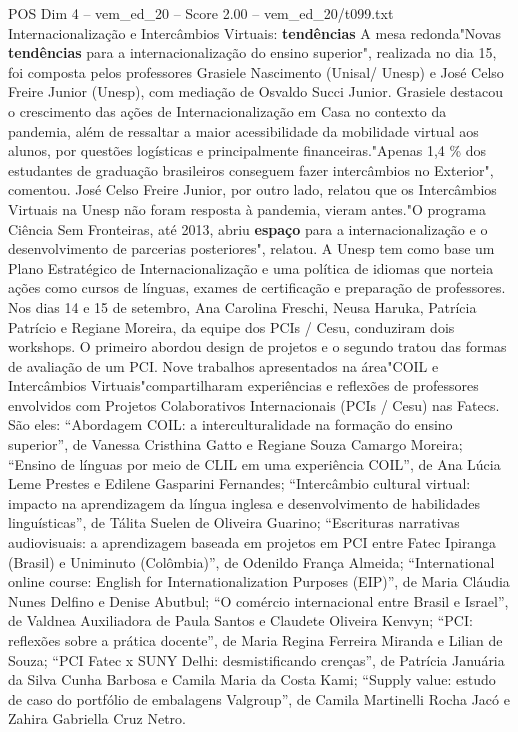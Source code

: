 \begin{textsample}{POS Dim 4 – vem\_ed\_20 – Score 2.00 – vem\_ed\_20/t099.txt}  \label{ex:f4_pos_161}
Internacionalização e Intercâmbios Virtuais: \textbf{tendências} A mesa redonda"Novas \textbf{tendências} para a internacionalização do ensino superior", realizada no dia 15, foi composta pelos professores Grasiele Nascimento (Unisal/ Unesp) e José Celso Freire Junior (Unesp), com mediação de Osvaldo Succi Junior.
Grasiele destacou o crescimento das ações de Internacionalização em Casa no contexto da pandemia, além de ressaltar a maior acessibilidade da mobilidade virtual aos alunos, por questões logísticas e principalmente financeiras."Apenas 1,4 \% dos estudantes de graduação brasileiros conseguem fazer intercâmbios no Exterior", comentou.
José Celso Freire Junior, por outro lado, relatou que os Intercâmbios Virtuais na Unesp não foram resposta à pandemia, vieram antes."O programa Ciência Sem Fronteiras, até 2013, abriu \textbf{espaço} para a internacionalização e o desenvolvimento de parcerias posteriores", relatou.
A Unesp tem como base um Plano Estratégico de Internacionalização e uma política de idiomas que norteia ações como cursos de línguas, exames de certificação e preparação de professores.
Nos dias 14 e 15 de setembro, Ana Carolina Freschi, Neusa Haruka, Patrícia Patrício e Regiane Moreira, da equipe dos PCIs / Cesu, conduziram dois workshops.
O primeiro abordou design de projetos e o segundo tratou das formas de avaliação de um PCI.
Nove trabalhos apresentados na área"COIL e Intercâmbios Virtuais"compartilharam experiências e reflexões de professores envolvidos com Projetos Colaborativos Internacionais (PCIs / Cesu) nas Fatecs.
São eles: “Abordagem COIL: a interculturalidade na formação do ensino superior”, de Vanessa Cristhina Gatto e Regiane Souza Camargo Moreira; “Ensino de línguas por meio de CLIL em uma experiência COIL”, de Ana Lúcia Leme Prestes e Edilene Gasparini Fernandes; “Intercâmbio cultural virtual: impacto na aprendizagem da língua inglesa e desenvolvimento de habilidades linguísticas”, de Tálita Suelen de Oliveira Guarino; “Escrituras narrativas audiovisuais: a aprendizagem baseada em projetos em PCI entre Fatec Ipiranga (Brasil) e Uniminuto (Colômbia)”, de Odenildo França Almeida; “International online course: English for Internationalization Purposes (EIP)”, de Maria Cláudia Nunes Delfino e Denise Abutbul; “O comércio internacional entre Brasil e Israel”, de Valdnea Auxiliadora de Paula Santos e Claudete Oliveira Kenvyn; “PCI: reflexões sobre a prática docente”, de Maria Regina Ferreira Miranda e Lilian de Souza; “PCI Fatec x SUNY Delhi: desmistificando crenças”, de Patrícia Januária da Silva Cunha Barbosa e Camila Maria da Costa Kami; “Supply value: estudo de caso do portfólio de embalagens Valgroup”, de Camila Martinelli Rocha Jacó e Zahira Gabriella Cruz Netro.

\end{textsample}
